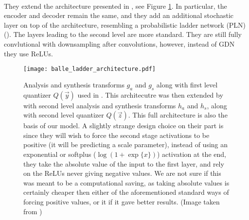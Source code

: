 \paragraph{\cite{balle2018variational}} They extend the architecture presented in
\cite{balle2016end}, see Figure \ref{fig:balle_ladder_arch}.
In particular, the encoder and decoder remain the same,
and they add an additional stochastic layer on top of the architecture,
resembling a probabilistic ladder network (PLN) (\cite{sonderby2016train}).
The layers leading to the second level are more standard. They are still fully
convlutional with downsampling after convolutions, however, instead of GDN
they use ReLUs.
\par

\begin{figure}
  \centering 
  \texttt{[image: balle\_ladder\_architecture.pdf]}
  \caption{Analysis and synthesis transforms $g_a$ and $g_s$ along with first
    level quantizer $Q(\vec{y})$ used in \cite{balle2016end}. This architecutre
    was then extended by \cite{balle2018variational} with second level analysis
    and synthesis transforms $h_a$ and $h_s$, along with second level quantizer
    $Q(\vec{z})$. This full architecture is also the basis of our model. A
    slightly strange design choice on their part is since they will wish to
    force the second stage activations to be positive (it will be predicting
    a scale parameter), instead of using an exponential or softplus
    ($\log (1 + \exp\{x\})$) activation at the end, they take the absolute value
    of the input to the first layer, and rely on the ReLUs never giving negative
    values. We are not sure if this was meant to be a computational saving, as
    taking absolute values is certainly cheaper then either of the
    aforementioned standard ways of forcing positive values, or it if it gave
    better results.
    (Image taken from \cite{balle2018variational})}
  \label{fig:balle_ladder_arch}
\end{figure}

